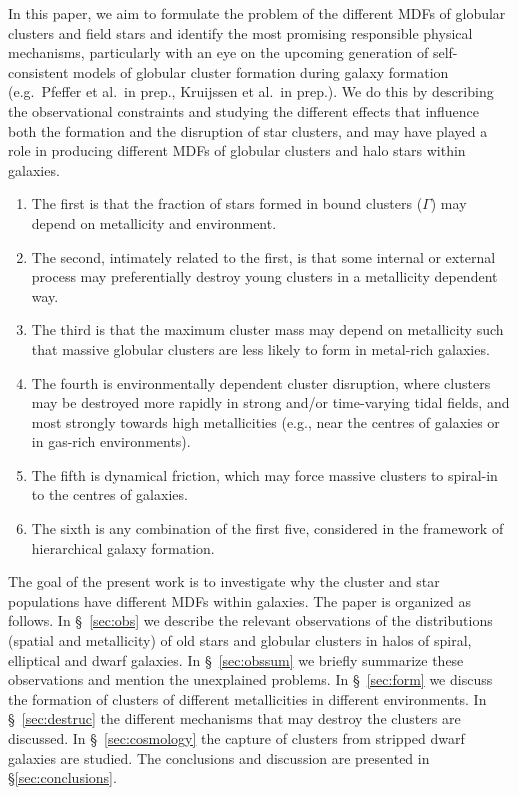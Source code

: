 \documentclass{aa}
\begin{document}
In this paper, we aim to formulate the problem of the different MDFs of globular clusters and field stars and identify the most promising responsible physical mechanisms, particularly with an eye on the upcoming generation of self-consistent models of globular cluster formation during galaxy formation (e.g.~Pfeffer et al.~in prep., Kruijssen et al.~in prep.).
We do this by describing the observational constraints and studying the different effects that influence both the formation and the disruption of star clusters, and may have played a role in producing different MDFs of globular clusters and halo stars within galaxies.
\begin{enumerate}
\item The first is that the fraction of stars formed in bound clusters ($\Gamma$) may depend on metallicity and environment. 
\item The second, intimately related to the first, is that some internal or external process may preferentially destroy young clusters in a metallicity dependent way.
\item The third is that the maximum cluster mass may depend on metallicity such that massive globular clusters are less likely to form in metal-rich galaxies.
\item The fourth is environmentally dependent cluster disruption, where clusters may be destroyed more rapidly in strong and/or time-varying tidal fields, and most strongly towards high metallicities (e.g., near the centres of galaxies or in gas-rich environments). 
\item The fifth is dynamical friction, which may force massive clusters to spiral-in to the centres of galaxies.
\item The sixth is any combination of the first five, considered in the framework of hierarchical galaxy formation. 
\end{enumerate}

The goal of the present work is to investigate why the cluster and star populations have different MDFs within galaxies. 
The paper is organized as follows.
 In \S~\ref{sec:obs} we describe the relevant observations of the distributions (spatial and metallicity) of old stars and globular clusters in halos of spiral, elliptical and dwarf galaxies.  
In \S~\ref{sec:obssum} we briefly summarize these observations and mention the unexplained problems.
In \S~\ref{sec:form} we discuss the formation of clusters of different metallicities in different environments.
In \S~\ref{sec:destruc} the different mechanisms that may destroy the clusters are discussed.
In \S~\ref{sec:cosmology} the capture of clusters from stripped dwarf galaxies are studied.
The conclusions and discussion are presented in \S\ref{sec:conclusions}. 
\end{document}
